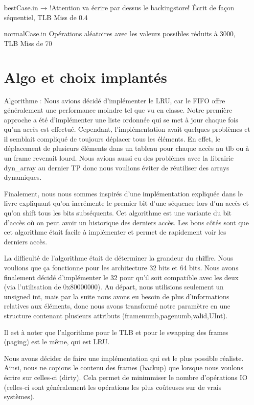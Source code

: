 \documentclass{article}
\begin{document}
bestCase.in → !Attention va écrire par dessus le backingstore!
Écrit de façon séquentiel, TLB Miss de 0.4%

normalCase.in
Opérations aléatoires avec les valeurs possibles réduits à 3000, TLB Miss de 70%

\section{Algo et choix implantés}
\par
Algorithme : Nous avions décidé d’implémenter le LRU, car le FIFO offre généralement une performance moindre tel que vu en classe. Notre première approche a été d’implémenter une liste ordonnée qui se met à jour chaque fois qu’un accès est effectué. Cependant, l’implémentation avait quelques problèmes et il semblait compliqué de toujours déplacer tous les éléments. En effet, le déplacement de plusieurs éléments dans un tableau pour chaque accès au tlb ou à un frame revenait lourd. Nous avions aussi eu des problèmes avec la librairie dyn_array au dernier TP donc nous voulions éviter de réutiliser des arrays dynamiques. 

Finalement, nous nous sommes inspirés d’une implémentation expliquée dans le livre expliquant qu’on incrémente le premier bit d’une séquence lors d’un accès et qu’on shift tous les bits subséquents. Cet algorithme est une variante du bit d’accès où on peut avoir un historique des derniers accès. Les bons côtés sont que cet algorithme était facile à implémenter et permet de rapidement voir les derniers accès. 

La difficulté de l’algorithme était de déterminer la grandeur du chiffre. Nous voulions que ça fonctionne pour les architecture 32 bits et 64 bits. Nous avons finalement décidé d’implémenter le 32 pour qu’il soit compatible avec les deux (via l’utilisation de 0x80000000). Au départ, nous utilisions seulement un unsigned int, mais par la suite nous avons eu besoin de plus d’informations relatives aux éléments, donc nous avons transformé notre paramètre en une structure contenant plusieurs attributs (framenumb,pagenumb,valid,UInt).

Il est à noter que l’algorithme pour le TLB et pour le swapping des frames (paging) est le même, qui est LRU.

\par
Nous avons décider de faire une implémentation qui est le plus possible réaliste. Ainsi, nous ne copions le contenu des frames (backup) que lorsque nous voulons écrire sur celles-ci (dirty). Cela permet de minimmiser le nombre d’opérations IO (celles-ci sont généralement les opérations les plus coûteuses sur de vrais systèmes). 
\end{document}

